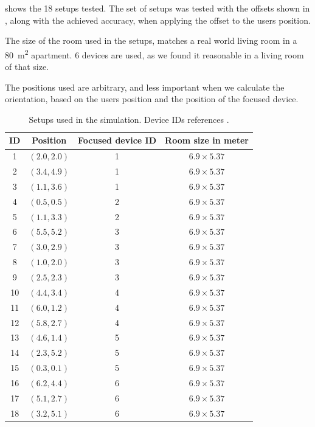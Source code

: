  shows the \num{18} setups tested. 
The set of setups was tested with the offsets shown in , 
along with the achieved accuracy, 
when applying the offset to the users position.

The size of the room used in the setups, 
matches a real world living room in a \SI{80}{\square\meter} apartment. 
\num{6} devices are used, 
as we found it reasonable in a living room of that size.

The positions used are arbitrary, 
and less important when we calculate the orientation, 
based on the users position and the position of the focused device.

\begin{table}[!hbt]
\centering
\begin{tabular}{c|ccc}
	ID &   Position    & Focused device ID & Room size in meter \\ \hline
	1  & $(2.0 , 2.0)$ &         1         & $6.9 \times 5.37$  \\
	2  & $(3.4 , 4.9)$ &         1         & $6.9 \times 5.37$  \\
	3  & $(1.1 , 3.6)$ &         1         & $6.9 \times 5.37$  \\
	4  & $(0.5 , 0.5)$ &         2         & $6.9 \times 5.37$  \\
	5  & $(1.1 , 3.3)$ &         2         & $6.9 \times 5.37$  \\
	6  & $(5.5 , 5.2)$ &         3         & $6.9 \times 5.37$  \\
	7  & $(3.0 , 2.9)$ &         3         & $6.9 \times 5.37$  \\
	8  & $(1.0 , 2.0)$ &         3         & $6.9 \times 5.37$  \\
	9  & $(2.5 , 2.3)$ &         3         & $6.9 \times 5.37$  \\
	10 & $(4.4 , 3.4)$ &         4         & $6.9 \times 5.37$  \\
	11 & $(6.0 , 1.2)$ &         4         & $6.9 \times 5.37$  \\
	12 & $(5.8 , 2.7)$ &         4         & $6.9 \times 5.37$  \\
	13 & $(4.6 , 1.4)$ &         5         & $6.9 \times 5.37$  \\
	14 & $(2.3 , 5.2)$ &         5         & $6.9 \times 5.37$  \\
	15 & $(0.3 , 0.1)$ &         5         & $6.9 \times 5.37$  \\
	16 & $(6.2 , 4.4)$ &         6         & $6.9 \times 5.37$  \\
	17 & $(5.1 , 2.7)$ &         6         & $6.9 \times 5.37$  \\
	18 & $(3.2 , 5.1)$ &         6         & $6.9 \times 5.37$
\end{tabular}
\caption{Setups used in the simulation. Device IDs references .}
\label{lst:evaluation:system-correctness:setups}
\end{table}

